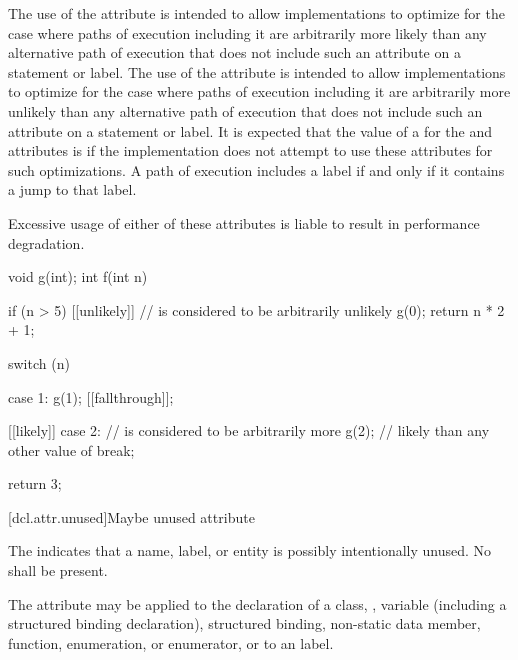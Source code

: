 \pnum
\begin{note}
The use of the  attribute
is intended to allow implementations to optimize for
the case where paths of execution including it
are arbitrarily more likely
than any alternative path of execution
that does not include such an attribute on a statement or label.
The use of the  attribute
is intended to allow implementations to optimize for
the case where paths of execution including it
are arbitrarily more unlikely
than any alternative path of execution
that does not include such an attribute on a statement or label.
It is expected that the value of a 
for the  and  attributes
is 
if the implementation does not attempt to use these attributes
for such optimizations.
A path of execution includes a label
if and only if it contains a jump to that label.
\end{note}
\begin{note}
Excessive usage of either of these attributes
is liable to result in performance degradation.
\end{note}

\pnum
\begin{example}
\begin{codeblock}
void g(int);
int f(int n) {
  if (n > 5) [[unlikely]] {     //  is considered to be arbitrarily unlikely
    g(0);
    return n * 2 + 1;
  }

  switch (n) {
  case 1:
    g(1);
    [[fallthrough]];

  [[likely]] case 2:            //  is considered to be arbitrarily more
    g(2);                       // likely than any other value of 
    break;
  }
  return 3;
}
\end{codeblock}
\end{example}

[dcl.attr.unused]{Maybe unused attribute}%

\pnum
The  
indicates that a name, label, or entity is possibly intentionally unused.
No  shall be present.

\pnum
The attribute may be applied to the declaration of a class,
,
variable (including a structured binding declaration),
structured binding,
non-static data member,
function,
enumeration, or
enumerator, or
to an  label.

